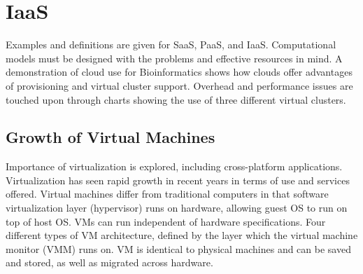 \chapter{IaaS}

\label{sec:icloud-iaas}

\FILENAME

Examples and definitions are given for SaaS, PaaS, and IaaS.
Computational models must be designed with the problems and effective
resources in mind. A demonstration of cloud use for Bioinformatics
shows how clouds offer advantages of provisioning and virtual cluster
support. Overhead and performance issues are touched upon through
charts showing the use of three different virtual clusters.


\begin{comment}
\TODO{This video is outdated, start wom abou 1:00 to end}
\TODO{The content seems redundant, we will provide an updated lecture.}

\video{Cloud}{7:45}{Course Expectations}{https://www.youtube.com/watch?v=j3sUW376pw8}

\slides{Cloud}{Page 1}{Course Expectations}{https://drive.google.com/open?id=0B88HKpainTSfQU1uQmxZWHdWQ1k}

\slides{Cloud}{Page 1}{Course Expectations - pptx}{https://drive.google.com/open?id=0B88HKpainTSfb1ZhWG4zTEg0SVk}
\end{comment}

\section{Growth of Virtual Machines}

Importance of virtualization is explored, including cross-platform
applications. Virtualization has seen rapid growth in recent years in
terms of use and services offered. Virtual machines differ from
traditional computers in that software virtualization layer (hypervisor)
runs on hardware, allowing guest OS to run on top of host OS. VMs can
run independent of hardware specifications. Four different types of VM
architecture, defined by the layer which the virtual machine monitor
(VMM) runs on. VM is identical to physical machines and can be saved and
stored, as well as migrated across hardware.



